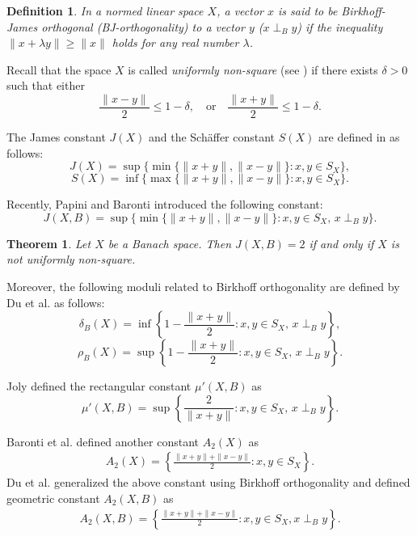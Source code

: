 \documentclass[preprint,12pt]{elsarticle}
\newtheorem{theorem}{Theorem}[section]
\newtheorem{definition}[thm]{Definition}
\numberwithin{equation}{section}
\begin{document}
\begin{definition}\label{k51}\cite{birkhoff1935orthogonality}
In a normed linear space $X$, a vector $x$ is said to be Birkhoff-James orthogonal (BJ-orthogonality) to a vector $y$ ($x \perp_B y$) if the inequality $\|x+\lambda y\| \geq \|x\|$ holds for any real number $\lambda$.
\end{definition}


Recall that the space $X$ is called \textit{uniformly non-square} (see \cite{james1964uniformly}) 
if there exists $\delta > 0$ such that either 
\[
\frac{\|x-y\|}{2} \leq 1 - \delta, 
\quad \text{or} \quad 
\frac{\|x+y\|}{2} \leq 1 - \delta.
\]

\medskip
The James constant $J(X)$ and the Schäffer constant $S(X)$ are defined in \cite{gao1990geometry} as follows:
\[
J(X) = \sup \{ \min\{\|x+y\|, \|x-y\|\} : x,y \in S_X \},
\]
\[
S(X) = \inf \{ \max\{\|x+y\|, \|x-y\|\} : x,y \in S_X \}.
\]

Recently, Papini and Baronti  \cite{papini2022parameters} introduced the following constant:
\[
J(X,B) = \sup \{ \min\{\|x+y\|, \|x-y\|\} : x,y \in S_X,\, x \perp_B y \}.
\]
\begin{theorem}\label{j22}\cite{papini2022parameters}
Let $X$ be a Banach space. Then $J(X,B)=2$
 if and only if $X$ is not uniformly non-square.
\end{theorem}


Moreover, the following moduli related to Birkhoff orthogonality are defined by Du et al. \cite{du2023some} as follows:
\[
\delta_B(X) = \inf \left\{ 1 - \frac{\|x+y\|}{2} : x,y \in S_X,\, x \perp_B y \right\},
\]
\[
\rho_B(X) = \sup \left\{ 1 - \frac{\|x+y\|}{2} : x,y \in S_X,\, x \perp_B y \right\}.
\]

Joly \cite{joly1969caracterisations} defined the rectangular constant  $\mu'(X,B)$  as 
\[
\mu'(X,B) = \sup\left\{\frac{2}{\|x+y\|} : x,y \in S_X,\, x \perp_B y \right\}.
\]


Baronti et al. \cite{baronti2000triangles} defined another constant $A_2(X)$ as
\begin{align*}
A_2(X)=\left\{\frac{\|x+y\|+\|x-y\|}{2}: x,y \in S_X\right\}. 
\end{align*}
Du et al. \cite{du2025some} generalized the above constant using Birkhoff orthogonality and defined geometric constant $A_2(X,B)$ as
\begin{align*}
A_2(X,B)=\left\{\frac{\|x+y\|+\|x-y\|}{2}: x,y \in S_X, x\perp_B y\right\}. 
\end{align*}
\end{document}
